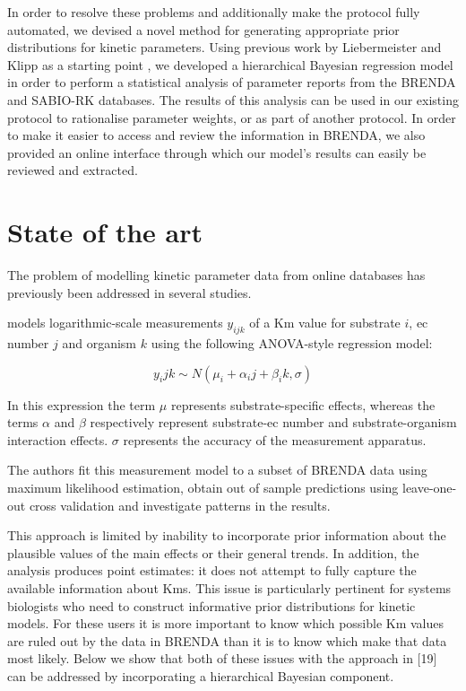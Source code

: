 \documentclass[11pt]{article}
\begin{document}
In order to resolve these problems and additionally make the protocol fully
automated, we devised a novel method for generating appropriate prior
distributions for kinetic parameters. Using previous work by Liebermeister and
Klipp as a starting point , we
developed a hierarchical Bayesian regression model in order to perform a
statistical analysis of parameter reports from the BRENDA  and SABIO-RK  databases. The results of this
analysis can be used in our existing protocol to rationalise parameter weights,
or as part of another protocol.  In order to make it easier to access and review
the information in BRENDA, we also provided an online interface through which
our model’s results can easily be reviewed and extracted.

\section{State of the art}
\label{sec:orgdd26fbe}
The problem of modelling kinetic parameter data from online databases has
previously been addressed in several studies.

 models logarithmic-scale measurements
\(y_{ijk}\) of a Km value for substrate \(i\), ec number \(j\) and organism \(k\) using
the following ANOVA-style regression model:

\begin{equation}
y_ijk \sim N(\mu_i + \alpha_ij + \beta_ik, \sigma)
\end{equation}

In this expression the term \(\mu\) represents substrate-specific effects, whereas
the terms \(\alpha\) and \(\beta\) respectively represent substrate-ec number and
substrate-organism interaction effects. \(\sigma\) represents the accuracy of the
measurement apparatus.

The authors fit this measurement model to a subset of BRENDA data using maximum
likelihood estimation, obtain out of sample predictions using leave-one-out
cross validation and investigate patterns in the results.

This approach is limited by inability to incorporate prior information about the
plausible values of the main effects or their general trends. In addition, the
analysis produces point estimates: it does not attempt to fully capture the
available information about Kms. This issue is particularly pertinent for
systems biologists who need to construct informative prior distributions for
kinetic models. For these users it is more important to know which possible Km
values are ruled out by the data in BRENDA than it is to know which make that
data most likely. Below we show that both of these issues with the approach in
[19] can be addressed by incorporating a hierarchical Bayesian component.
\end{document}
